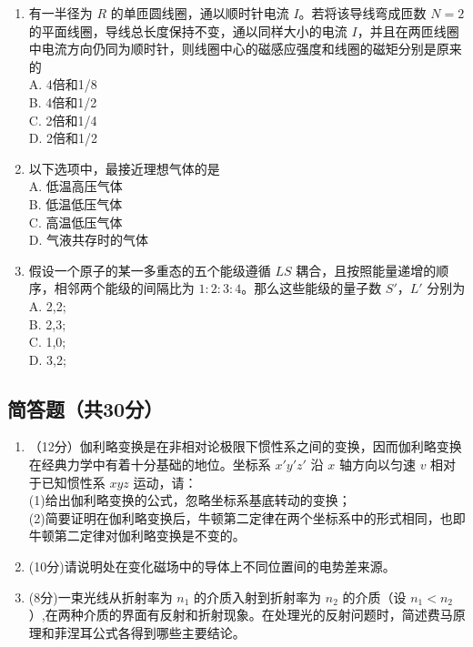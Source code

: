 \begin{enumerate}
\item 有一半径为 $R$ 的单匝圆线圈，通以顺时针电流 $I$。若将该导线弯成匝数 $N=2$ 的平面线圈，导线总长度保持不变，通以同样大小的电流 $I$，并且在两匝线圈中电流方向仍同为顺时针，则线圈中心的磁感应强度和线圈的磁矩分别是原来的\\
A. 4倍和1/8\\
B. 4倍和1/2\\
C. 2倍和1/4\\
D. 2倍和1/2\\

\item 以下选项中，最接近理想气体的是\\
A. 低温高压气体\\
B. 低温低压气体\\
C. 高温低压气体\\
D. 气液共存时的气体\\

\item 假设一个原子的某一多重态的五个能级遵循 $LS$ 耦合，且按照能量递增的顺序，相邻两个能级的间隔比为 $1:2:3:4$。那么这些能级的量子数 $S'$，$L'$ 分别为\\
A. 2,2;\\
B. 2,3;\\
C. 1,0;\\
D. 3,2;\\
\end{enumerate}
\subsection{简答题（共30分）}
\begin{enumerate}
\item （12分）伽利略变换是在非相对论极限下惯性系之间的变换，因而伽利略变换在经典力学中有着十分基础的地位。坐标系 $x'y'z'$ 沿 $x$ 轴方向以匀速 $v$ 相对于已知惯性系 $xyz$ 运动，请：\\
(1)给出伽利略变换的公式，忽略坐标系基底转动的变换；\\
(2)简要证明在伽利略变换后，牛顿第二定律在两个坐标系中的形式相同，也即牛顿第二定律对伽利略变换是不变的。\\

\item (10分)请说明处在变化磁场中的导体上不同位置间的电势差来源。

\item (8分)一束光线从折射率为 $n_{1}$ 的介质入射到折射率为 $n_{2}$ 的介质（设 $n_{1}<n_{2}$）,在两种介质的界面有反射和折射现象。在处理光的反射问题时，简述费马原理和菲涅耳公式各得到哪些主要结论。
\end{enumerate}
